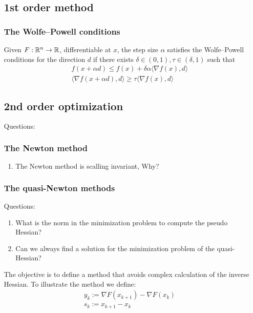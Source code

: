 \subsection{1st order method}

\subsubsection{The Wolfe--Powell conditions}
\begin{definition}
	Given $F: \mathbb{R}^n \rightarrow \mathbb{R}$, differentiable at $x$, the step size $\alpha$ satisfies the Wolfe--Powell conditions for the direction $d$ if there exists $\delta \in (0, 1), \tau \in (\delta, 1)$ such that 
	\begin{align*}
		& f( x + \alpha d ) \le f(x) + \delta \alpha \langle \nabla f(x), d \rangle\\
		& \langle \nabla f(x + \alpha d), d \rangle \ge \tau \langle \nabla f(x), d\rangle
	\end{align*}
\end{definition}


\subsection{2nd order optimization}
Questions: 
\subsubsection{The Newton method}
\begin{enumerate}
	\item The Newton method is scalling invariant, Why?
\end{enumerate}


\subsubsection{The quasi-Newton methods}
Questions: 
\begin{enumerate}
	\item What is the norm in the minimization problem to compute the pseudo Hessian?
	\item Can we always find a solution for the minimization problem of the quasi-Hessian?
\end{enumerate}
The objective is to define a method that avoids complex calculation of the inverse Hessian. To illustrate the method we define:
\begin{align*}
	&y_k:= \nabla F(x_{k + 1}) - \nabla F(x_k)\\
	&s_k:= x_{k + 1} - x_k
\end{align*}

